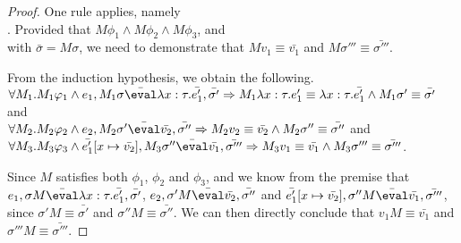 \begin{proof}
  {One rule applies, namely\\
  .
  Provided that $M\phi_1 \land M\phi_2\land M\phi_3$, and\\
   with $\bar{\sigma}=M\sigma$,
  we need to demonstrate that $M v_1 \equiv \bar{v_1}$ and $M\sigma'''\equiv\bar{\sigma'''}$.

  From the induction hypothesis, we obtain the following.\\
  $\forall M_1 . M_1\phi_1 \land e_1,M_1\sigma\bar{\eval}\lambda x : \tau.\bar{e_1'},\bar{\sigma'}
  \implies M_1\lambda x : \tau.e_1' \equiv \lambda x : \tau.\bar{e_1'} \land M_1\sigma'\equiv\bar{\sigma'}$
  and\\
  $\forall M_2 . M_2\phi_2 \land e_2,M_2\sigma'\bar{\eval}\bar{v_2},\bar{\sigma''}
  \implies M_2 v_2 \equiv \bar{v_2} \land M_2\sigma'' \equiv\bar{\sigma''}$
  and\\
  $\forall M_3 . M_3\phi_3 \land \bar{e_1'}[x\mapsto \bar{v_2}],M_3\sigma''\bar{\eval}\bar{v_1},\bar{\sigma'''}
  \implies M_3 v_1\equiv \bar{v_1} \land M_3 \sigma'''\equiv\bar{\sigma'''}$.

  Since $M$ satisfies both $\phi_1$, $\phi_2$ and $\phi_3$, and we know from the premise that $e_1,\sigma M\bar{\eval}\lambda x : \tau.\bar{e_1'},\bar{\sigma'}$, $e_2,\sigma' M\bar{\eval}\bar{v_2},\bar{\sigma''}$ and $\bar{e_1'}[x\mapsto \bar{v_2}],\sigma'' M\bar{\eval}\bar{v_1},\bar{\sigma'''}$,
  since $\sigma' M\equiv\bar{\sigma'}$ and $\sigma'' M\equiv\bar{\sigma''}$.
  We can then directly conclude that $v_1 M \equiv \bar{v_1}$ and $\sigma''' M\equiv\bar{\sigma'''}$.
  }

   {


}
\end{proof}
